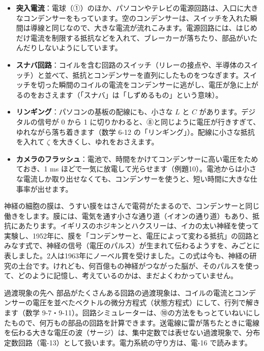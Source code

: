 \label{ph:電-9:sec11}
\begin{itemize}[leftmargin=1.2\zw, itemsep=2pt, topsep=2pt, label={\color{bkTheme}●}]
\item \textbf{突入電流}：電球（①）のほか、パソコンやテレビの電源回路は、入口に大きなコンデンサーをもっています。空のコンデンサーは、スイッチを入れた瞬間は導線と同じなので、大きな電流が流れこみます。電源回路には、はじめだけ電流を制限する抵抗などを入れて、ブレーカーが落ちたり、部品がいたんだりしないようにしています。
\item \textbf{スナバ回路}：コイルを含む回路のスイッチ（リレーの接点や、半導体のスイッチ）と並べて、抵抗とコンデンサーを直列にしたものをつなぎます。スイッチを切った瞬間のコイルの電流をコンデンサーに逃がし、電圧が急に上がるのをおさえます（「スナバ」は「しずめるもの」という意味）。
\item \textbf{リンギング}：パソコンの基板の配線にも、小さな $L$ と $C$ があります。デジタルの信号が 0 から 1 に切りかわると、⑧と同じように電圧が行きすぎて、ゆれながら落ち着きます（数学 6-12 の「リンギング」）。配線に小さな抵抗を入れて $\zeta$ を大きくし、ゆれをおさえます。
\item \textbf{カメラのフラッシュ}：電池で、時間をかけてコンデンサーに高い電圧をためておき、1 ms ほどで一気に放電して光らせます（例題10）。電池からは小さな電流しか取り出せなくても、コンデンサーを使うと、短い時間に大きな仕事率が出せます。
\end{itemize}

\begin{phmada}
神経の細胞の膜は、うすい膜をはさんで電荷がたまるので、コンデンサーと同じ働きをします。膜には、電気を通す小さな通り道（イオンの通り道）もあり、抵抗にあたります。イギリスのホジキンとハクスリーは、イカの太い神経を使って実験し、1952年に、膜を「コンデンサーと、電圧によって変わる抵抗」の回路とみなす式で、神経の信号（電圧のパルス）が生まれて伝わるようすを、みごとに表しました。2人は1963年にノーベル賞を受けました。この式は今も、神経の研究の土台です。けれども、何百億もの神経がつながった脳が、そのパルスを使って、どのように記憶し、考えているのかは、まだよくわかっていません。
\end{phmada}

\begin{phsaki}{過渡現象の先へ}
部品がたくさんある回路の過渡現象は、コイルの電流とコンデンサーの電圧を並べたベクトルの微分方程式（状態方程式）にして、行列で解きます（数学 9-7・9-11）。回路シミュレーターは、⑩の方法をもっとていねいにしたもので、何万もの部品の回路を計算できます。送電線に雷が落ちたときに電線を伝わる大きな電圧の波（サージ）は、集中定数では表せない過渡現象で、分布定数回路（電-13）として扱います。電力系統の守り方は、電-16 で読みます。
\end{phsaki}

